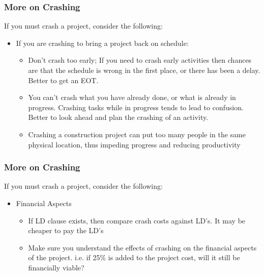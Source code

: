 \begin{frame}
\frametitle{More on Crashing}
If you must crash a project, consider the following:
\begin{itemize}
	\item If you are crashing to bring a project back on schedule:
			\begin{itemize}
				\item Don't crash too early; If you need to crash early activities then chances are that the schedule is wrong in the first place, or there has been a delay.  Better to get an EOT.
				\item You can't crash what you have already done, or what is already in progress.  Crashing tasks while in progress tends to lead to confusion.  Better to look ahead and plan the crashing of an activity.
				\item Crashing a construction project can put too many people in the same physical location, thus impeding progress and reducing productivity
			\end{itemize}
		
\end{itemize}
\end{frame}



\begin{frame}
\frametitle{More on Crashing}
If you must crash a project, consider the following:
\begin{itemize}
	\item Financial Aspects
		\begin{itemize}
			\item If LD clause exists, then compare crash costs against LD's.  It may be cheaper to pay the LD's
			\item Make sure you understand the effects of crashing on the financial aspects of the project.  i.e. if 25\% is added to the project cost, will it still be financially viable?
		\end{itemize}
\end{itemize}
\end{frame}






